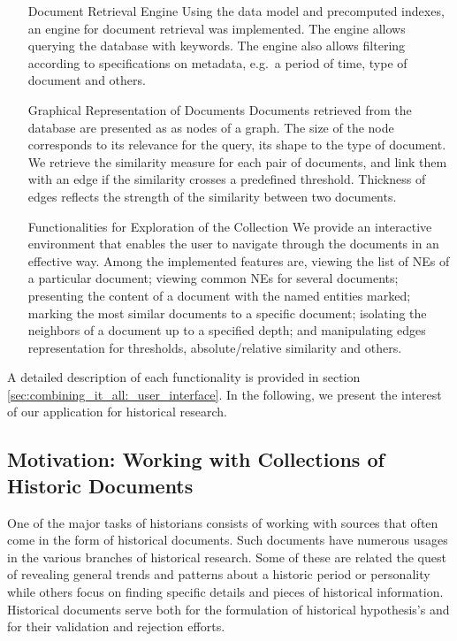 \begin{enumerate}
\item[Document Retrieval Engine] Using the data model and precomputed indexes, an engine for document retrieval was implemented. 
The engine allows querying the database with keywords. The engine also allows filtering according to specifications on metadata, e.g.\ a period of time, type of document and others. 
\item[Graphical Representation of Documents] Documents retrieved from the database are presented as as nodes of a graph. The size of the node corresponds to its relevance for the query, its shape to the type of document. We retrieve the similarity measure for each pair of documents, and link them with an edge if the similarity crosses a predefined threshold. Thickness of edges reflects the strength of the similarity between two documents.
\item[Functionalities for Exploration of the Collection] We provide an interactive environment that enables the user to navigate through the documents in an effective way. Among the implemented features are, viewing the list of NEs of a particular document; viewing common NEs for several documents; presenting the content of a document with the named entities marked; marking the most similar documents to a specific document; isolating the neighbors of a document up to a specified depth; and manipulating edges representation for thresholds, absolute/relative similarity and others.
\end{enumerate}

A detailed description of each functionality is provided in section \ref{sec:combining_it_all:_user_interface}. In the following, we present the interest of our application for historical research. 

\subsection{Motivation: Working with Collections of Historic Documents}
\label{sec:motivation}
One of the major tasks of historians consists of working with sources that often come in the form of historical documents. 
Such documents have numerous usages in the various branches of historical research. Some of these are related the quest of revealing 
general trends and patterns about a historic period or personality while others focus on finding specific details and pieces of historical 
information. Historical documents serve both for the formulation of historical hypothesis's and for their validation and rejection efforts. 

